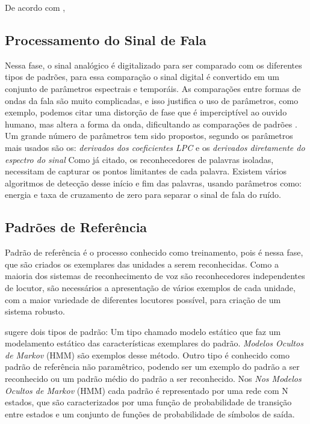 
De acordo com \cite{AvaliaTecJose}, 





\subsection{Processamento do Sinal de Fala}
Nessa fase, o sinal analógico é digitalizado para ser comparado com os diferentes tipos de padrões, para essa comparação o sinal digital é convertido em um conjunto de parâmetros espectrais e temporáis. As comparações entre formas de ondas da fala são muito complicadas, e isso justifica o uso de parâmetros, como exemplo, podemos citar uma distorção de fase que é imperciptível ao ouvido humano, mas altera a forma da onda, dificultando as comparações de padrões .\cite{AvaliaTecJose}
Um grande número de parâmetros tem sido propostos, segundo \cite{AvaliaTecJose} os parâmetros mais usados são os: \textit{derivados dos coeficientes LPC} e os \textit{derivados diretamente do espectro do sinal}
Como já citado, os reconhecedores de palavras isoladas, necessitam de capturar os pontos limitantes de cada palavra. Existem vários algoritmos de detecção desse início e fim das palavras, usando parâmetros como: energia e taxa de cruzamento de zero para separar o sinal de fala do ruído. \cite{AvaliaTecJose}

\subsection{Padrões de Referência}
Padrão de referência é o processo conhecido como treinamento, pois é nessa fase, que são criados os exemplares das unidades a serem reconhecidas. Como a maioria dos sistemas de reconhecimento de voz são reconhecedores independentes de locutor, são necessários a apresentação de vários exemplos de cada unidade, com a maior variedade de diferentes locutores possível, para criação de um sistema robusto. \cite{AvaliaTecJose}

\cite{DigSpeechNejat} sugere dois tipos de padrão: Um tipo chamado modelo estático que faz um modelamento estático das características exemplares do padrão. \textit{Modelos Ocultos de Markov} (HMM) \cite{FundamentRabiner} são exemplos desse método. Outro tipo é conhecido como padrão de referência não paramêtrico, podendo ser um exemplo do padrão a ser reconhecido ou um padrão médio do padrão a ser reconhecido. \cite{AvaliaTecJose}
Nos \textit{Nos Modelos Ocultos de Markov} (HMM) cada padrão é representado por uma rede com N estados, que são caracterizados por uma função de probabilidade de transição entre estados e um conjunto de funções de probabilidade de símbolos de saída. \cite{AvaliaTecJose}



